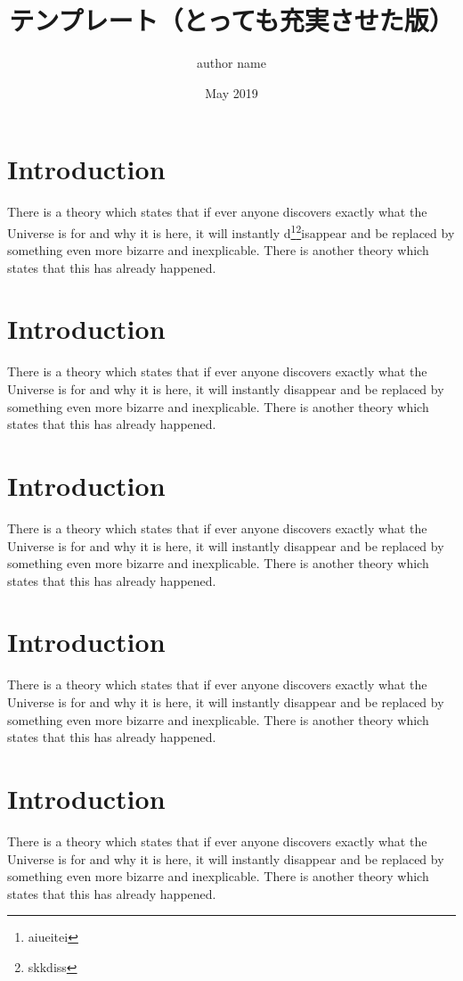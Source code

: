 \documentclass[a4paper,papersize,10pt,twoside,uplatex,dvipdfmx]{jsarticle}
\title{テンプレート（とっても充実させた版）}
\author{author name}
\date{May 2019}
\begin{document}
\maketitle\thispagestyle{fancy}

\section{Introduction}
There is a theory which states that if ever anyone discovers exactly what the Universe is for and why it is here, it will instantly d\footnote{aiueitei}\footnote{skkdiss}isappear and be replaced by something even more {\Large bizarre and inexplicable}.
There is another theory which states that this has already happened.

\section{Introduction}
There is a theory which states that if ever anyone discovers exactly what the Universe is for and why it is here, it will instantly disappear and be replaced by something even more bizarre and inexplicable.
There is another theory which states that this has already happened.

\section{Introduction}
There is a theory which states that if ever anyone discovers exactly what the Universe is for and why it is here, it will instantly disappear and be replaced by something even more bizarre and inexplicable.
There is another theory which states that this has already happened.

\section{Introduction}
There is a theory which states that if ever anyone discovers exactly what the Universe is for and why it is here, it will instantly disappear and be replaced by something even more bizarre and inexplicable.
There is another theory which states that this has already happened.

\section{Introduction}
There is a theory which states that if ever anyone discovers exactly what the Universe is for and why it is here, it will instantly disappear and be replaced by something even more bizarre and inexplicable.
There is another theory which states that this has already happened.
\end{document}
